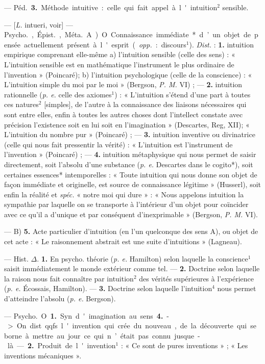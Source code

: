 \begin{itemize}[leftmargin=1cm, label=, itemsep=1pt]
— \si{Péd.} {\bf 3.} Méthode intuitive :
celle qui fait appel à l'intuition$^2$
sensible.

 — [{\it L.} intueri, voir] — \si{Psycho.},
\si{Épist.}, \si{Méta.} A) O. Connaissance
immédiate* d’un objet de pensée
actuellement présent à l'esprit ({\it opp.} :
discours$^1$). {\it Dist.} : {\bf 1.} intuition empirique comprenant elle-même
a) l'intuition sensible (celle des sens) :
« L'intuition sensible est en mathématique
l'instrument le plus ordinaire de
l'invention » (Poincaré); b) l'intuition psychologique (celle de la conscience) : « L’intuition simple du
moi par le moi » (Bergson, {\it P. M.}
VI) ; — {\bf 2.} intuition rationnelle ({\it p. e.}
celle des axiomes$^1$) : « L’intuition
s'étend d'une part à toutes ces
natures$^2$ [simples], de l’autre à la
connaissance des liaisons nécessaires
qui sont entre elles, enfin à toutes
les autres choses dont l’intellect
constate avec précision l'existence
soit en lui soit en l'imagination »
(Descartes, Reg, XII); « L’intuition du nombre pur » (Poincaré) ; —
 {\bf 3.} intuition inventive ou divinatrice
(celle qui nous fait pressentir la
vérité) : « L’intuition est l’instrument de l'invention » (Poincaré) ; —
 {\bf 4.} intuition métaphysique qui nous
permet de saisir directement, soit
l'absolu d’une substance ({\it p. e.} Descartes dans le cogito*), soit certaines
essences* intemporelles : « Toute
intuition qui nous donne son objet
de façon immédiate et originelle,
est source de connaissance légitime »
(Husserl), soit enfin la réalité et
{\it spéc.} « notre moi qui dure » : « Nous
appelons intuition la sympathie par
laquelle on se transporte à l’intérieur
d’un objet pour coïncider avec
ce qu'il a d’unique et par conséquent
d’inexprimable » (Bergson, {\it P. M.}
VI).

— B) {\bf 5.} Acte particulier d’intuition
(en l’un quelconque des
sens A), ou objet de cet acte : « Le
raisonnement abstrait est une suite
d’intuitions » (Lagneau).

 — \si{Hist.} $\Delta$. {\bf 1.} En psycho.
théorie ({\it p. e.} Hamilton) selon laquelle
la conscience$^1$ saisit immédiatement
le monde extérieur comme tel. —
 {\bf 2.} Doctrine selon laquelle la raison
nous fait connaître par intuition$^2$
des vérités supérieures à l’expérience
({\it p. e.} Écossais, Hamilton). —
 {\bf 3.} Doctrine selon laquelle l'intuition$^4$
nous permet d'atteindre l'absolu
({\it p. e.} Bergson).

 — \si{Psycho.} O. {\bf 1.} Syn.
d'imagination au sens {\bf 4.} -> On
dist. qqfs. l'invention qui crée du
nouveau, de la découverte qui se
borne à mettre au jour ce qui n’était
pas connu jusque-là. — {\bf 2.} Produit
de l'invention$^1$ : « Ce sont de
pures inventions » ; « Les inventions
mécaniques ».


\end{itemize}
